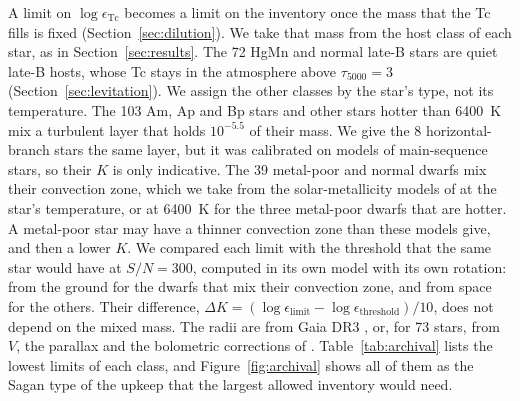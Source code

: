 \documentclass[final,5p]{elsarticle}
\begin{document}
A limit on $\log\epsilon_\mathrm{Tc}$ becomes a limit on the inventory once the mass that the Tc fills is fixed (Section~\ref{sec:dilution}). We take that mass from the host class of each star, as in Section~\ref{sec:results}. The 72 HgMn and normal late-B stars are quiet late-B hosts, whose Tc stays in the atmosphere above $\tau_{5000} = 3$ (Section~\ref{sec:levitation}). We assign the other classes by the star's type, not its temperature. The 103 Am, Ap and Bp stars and other stars hotter than 6400~K mix a turbulent layer that holds $10^{-5.5}$ of their mass. We give the 8 horizontal-branch stars the same layer, but it was calibrated on models of main-sequence stars, so their $K$ is only indicative. The 39 metal-poor and normal dwarfs mix their convection zone, which we take from the solar-metallicity models of \citet{Pinsonneault2001} at the star's temperature, or at 6400~K for the three metal-poor dwarfs that are hotter. A metal-poor star may have a thinner convection zone than these models give, and then a lower $K$. We compared each limit with the threshold that the same star would have at $S/N = 300$, computed in its own model with its own rotation:  from the ground for the dwarfs that mix their convection zone, and  from space for the others. Their difference, $\Delta K = (\log\epsilon_\mathrm{limit} - \log\epsilon_\mathrm{threshold})/10$, does not depend on the mixed mass. The radii are from Gaia DR3 \citep{Creevey2023}, or, for 73 stars, from $V$, the parallax and the bolometric corrections of \citet{Torres2010}. Table~\ref{tab:archival} lists the lowest limits of each class, and Figure~\ref{fig:archival} shows all of them as the Sagan type of the upkeep that the largest allowed inventory would need.

\begin{table}[t]
\centering
\caption{The lowest archival limits of each host class. $\log\epsilon_\mathrm{Tc}$ is the upper limit, set by the line and instrument listed. Threshold: the abundance that the same star would show at $Z = 5$ and $S/N = 300$ in its own model (Section~\ref{sec:archival_results}). $K$ is the Sagan type of the upkeep of the largest inventory that the limit allows, when the Tc fills the mixed mass of the star's class. $\Delta K = (\log\epsilon_\mathrm{Tc} - \mathrm{threshold})/10$; a negative $\Delta K$ means that the spectrum already excludes the beacon that the star would show at threshold.}
\label{tab:archival}
\footnotesize
\setlength{\tabcolsep}{4pt}
\iftwocol\else\resizebox{\textwidth}{!}{}\fi
\end{table}
\end{document}
